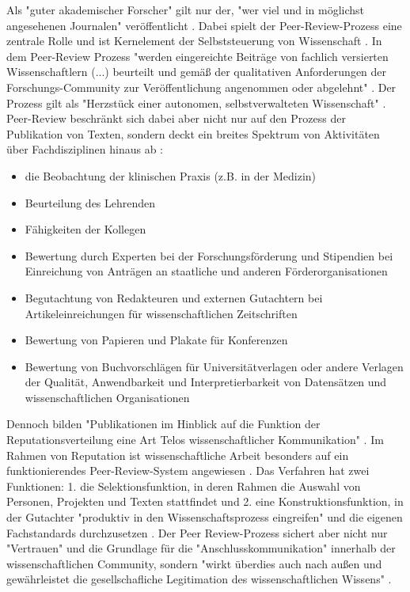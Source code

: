 Als "guter akademischer Forscher" gilt nur der, "wer viel und in möglichst angesehenen Journalen" veröffentlicht \cite{Frey_2005}. Dabei spielt der Peer-Review-Prozess eine zentrale Rolle und ist Kernelement der Selbststeuerung von Wissenschaft \cite{Neidhardt_2010}. In dem Peer-Review Prozess "werden eingereichte Beiträge von fachlich versierten Wissenschaftlern (...) beurteilt und gemäß der qualitativen Anforderungen der Forschungs-Community zur Veröffentlichung angenommen oder abgelehnt" \cite{Hess_2006}. Der Prozess gilt als "Herzstück einer autonomen, selbstverwalteten Wissenschaft" \cite{suchen_Hornbostel_2006}. Peer-Review beschränkt sich dabei aber nicht nur auf den Prozess der Publikation von Texten, sondern deckt ein breites Spektrum von Aktivitäten über Fachdisziplinen hinaus ab \cite{Lee_2012}:
\begin{itemize}
\item die Beobachtung der klinischen Praxis (z.B. in der Medizin)
\item Beurteilung des Lehrenden
\item Fähigkeiten der Kollegen
\item Bewertung durch Experten bei der Forschungsförderung und Stipendien bei Einreichung von Anträgen an staatliche und anderen Förderorganisationen
\item Begutachtung von Redakteuren und externen Gutachtern bei Artikeleinreichungen für wissenschaftlichen Zeitschriften
\item Bewertung von Papieren und Plakate für Konferenzen
\item Bewertung von Buchvorschlägen für Universitätverlagen oder andere Verlagen
 der Qualität, Anwendbarkeit und Interpretierbarkeit von Datensätzen und wissenschaftlichen Organisationen
\end{itemize} Dennoch bilden "Publikationen im Hinblick auf die Funktion der Reputationsverteilung eine Art Telos wissenschaftlicher Kommunikation" \cite{hirschauer2004peer}. Im Rahmen von Reputation ist wissenschaftliche Arbeit besonders auf ein funktionierendes Peer-Review-System angewiesen \cite{suchen}. Das Verfahren hat zwei Funktionen: 1. die Selektionsfunktion, in deren Rahmen die Auswahl von Personen, Projekten und Texten stattfindet und 2. eine Konstruktionsfunktion, in der Gutachter "produktiv in den Wissenschaftsprozess eingreifen" und die eigenen Fachstandards durchzusetzen \cite{Neidhardt_2010}. Der Peer Review-Prozess sichert aber nicht nur "Vertrauen" und die Grundlage für die "Anschlusskommunikation" innerhalb der wissenschaftlichen Community, sondern "wirkt überdies auch nach außen und gewährleistet die gesellschafliche Legitimation des wissenschaftlichen Wissens" \cite{pscheida_2010_wikipedia}.

